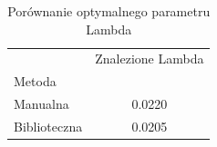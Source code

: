 \begin{table}[H]
\caption{Porównanie optymalnego parametru Lambda}
\label{tab:bc_comp}
\begin{tabular}{lc}
\toprule
 & Znalezione Lambda \\
Metoda &  \\
\midrule
Manualna & 0.0220 \\
Biblioteczna  & 0.0205 \\
\bottomrule
\end{tabular}
\end{table}

